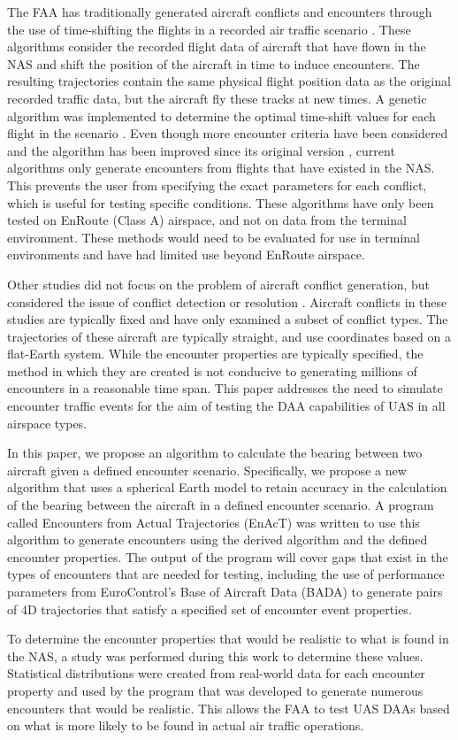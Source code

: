 The FAA has traditionally generated aircraft conflicts and encounters through the use of time-shifting the flights in a recorded air traffic scenario \cite{oaks:2001, paglione:2003}. These algorithms consider the recorded flight data of aircraft that have flown in the NAS and shift the position of the aircraft in time to induce encounters. The resulting trajectories contain the same physical flight position data as the original recorded traffic data, but the aircraft fly these tracks at new times. A genetic algorithm was implemented to determine the optimal time-shift values for each flight in the scenario \cite{oaks:2002a}. Even though more encounter criteria have been considered \cite{oaks:2002b} and the algorithm has been improved since its original version \cite{ritchie:2016}, current algorithms only generate encounters from flights that have existed in the NAS. This prevents the user from specifying the exact parameters for each conflict, which is useful for testing specific conditions. These algorithms have only been tested on EnRoute (Class A) airspace, and not on data from the terminal environment. These methods would need to be evaluated for use in terminal environments and have had limited use beyond EnRoute airspace.

Other studies did not focus on the problem of aircraft conflict generation, but considered the issue of conflict detection or resolution \cite{malaek:2011, ming:2011, liu:2014, yang:2017}. Aircraft conflicts in these studies are typically fixed and have only examined a subset of conflict types. The trajectories of these aircraft are typically straight, and use coordinates based on a flat-Earth system. While the encounter properties are typically specified, the method in which they are created is not conducive to generating millions of encounters in a reasonable time span. This paper addresses the need to simulate encounter traffic events for the aim of testing the DAA capabilities of UAS in all airspace types. 

In this paper, we propose an algorithm to calculate the bearing between two aircraft given a defined encounter scenario. Specifically, we propose a new algorithm that uses a spherical Earth model to retain accuracy in the calculation of the bearing between the aircraft in a defined encounter scenario. A program called Encounters from Actual Trajectories (EnAcT) was written to use this algorithm to generate encounters using the derived algorithm and the defined encounter properties. The output of the program will cover gaps that exist in the types of encounters that are needed for testing, including the use of performance parameters from EuroControl's Base of Aircraft Data (BADA) \cite{bada:v3} to generate pairs of 4D trajectories that satisfy a specified set of encounter event properties. 

To determine the encounter properties that would be realistic to what is found in the NAS, a study was performed during this work to determine these values. Statistical distributions were created from real-world data for each encounter property and used by the program that was developed to generate numerous encounters that would be realistic. This allows the FAA to test UAS DAAs based on what is more likely to be found in actual air traffic operations.
